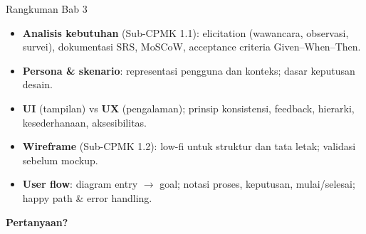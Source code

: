 \documentclass[handout]{beamer}
\begin{document}
\begin{frame}{Rangkuman Bab 3}
	\begin{itemize}
		\item \textbf{Analisis kebutuhan} (Sub-CPMK 1.1): elicitation (wawancara, observasi, survei), dokumentasi SRS, MoSCoW, acceptance criteria Given--When--Then.
		\item \textbf{Persona \& skenario}: representasi pengguna dan konteks; dasar keputusan desain.
		\item \textbf{UI} (tampilan) vs \textbf{UX} (pengalaman); prinsip konsistensi, feedback, hierarki, kesederhanaan, aksesibilitas.
		\item \textbf{Wireframe} (Sub-CPMK 1.2): low-fi untuk struktur dan tata letak; validasi sebelum mockup.
		\item \textbf{User flow}: diagram entry $\to$ goal; notasi proses, keputusan, mulai/selesai; happy path \& error handling.
	\end{itemize}
\end{frame}

\begin{frame}{}
	\centering
	\vfill
	\textbf{\Large Pertanyaan?}
	\vfill
\end{frame}
\end{document}
